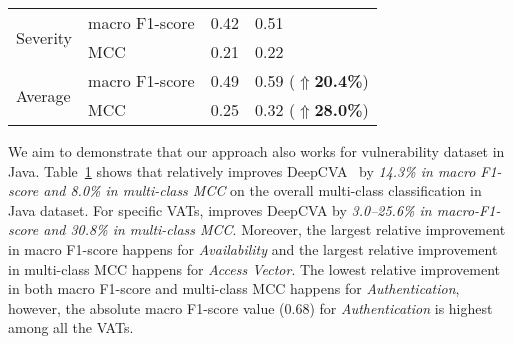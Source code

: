 \begin{table}[t]
\begin{center}
\begin{tabular}{l|p{1.9cm}<{\centering}|p{1.5cm}<{\centering}|p{1.5cm}<{\centering}}
			\hline
			\multirow{2}{*}{Severity}        & macro F1-score                             &   0.42         & 0.51\\
			\cline{2-4}
			& MCC                                 &   0.21         & 0.22\\
			\hline
			\hline
			\multirow{2}{*}{Average}         & macro F1-score                             &    0.49        & 0.59 ($\Uparrow${\bf 20.4\%})\\
			\cline{2-4}
			& MCC                                 & 0.25           & 0.32 ($\Uparrow${\bf 28.0\%})\\
			\hline
		\end{tabular}
		\label{rq2_results}
	\end{center}
\end{table}

We aim to demonstrate that our approach also works for vulnerability
dataset in Java. Table~\ref{rq2_results} shows that {\tool} relatively
improves DeepCVA~\cite{deepCVA-ase21} by {\em 14.3\% in macro F1-score
and 8.0\% in multi-class MCC} on the overall multi-class
classification in Java dataset. For specific VATs, {\tool} improves
DeepCVA by {\em 3.0--25.6\% in macro-F1-score and 30.8\% in
multi-class MCC}. Moreover, the largest relative improvement in macro
F1-score happens for {\em Availability} and the largest relative
improvement in multi-class MCC happens for {\em Access Vector}. The
lowest relative improvement in both macro F1-score and multi-class MCC
happens for {\em Authentication}, however, the absolute macro F1-score
value (0.68) for {\em Authentication} is highest among all the VATs.

